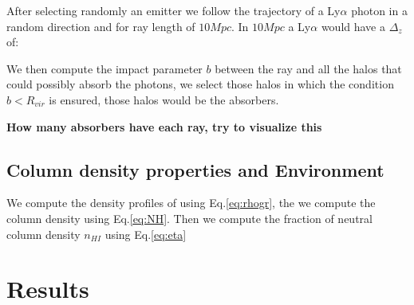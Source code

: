\documentclass[12pt]{article}
\begin{document}
After selecting randomly an emitter we follow the trajectory of a Ly$\alpha$ photon
in a random direction and for ray length of $10 Mpc$. In $10 Mpc$ a Ly$\alpha$ would
have a $\Delta_z$ of:


We then compute the impact parameter $b$ between the ray and all the halos that could
possibly absorb the photons, we select those halos in which the condition $b<R_{vir}$
is ensured, those halos would be the absorbers.



\textbf{How many absorbers have each ray, try to visualize this}

\subsection{Column density properties and Environment}

We compute the density profiles of using Eq.\ref{eq:rhogr}, the
we compute the column density using Eq.\ref{eq:NH}. Then we compute
the fraction of neutral column density $n_{HI}$ using Eq.\ref{eq:eta}



\section{Results}
\end{document}
